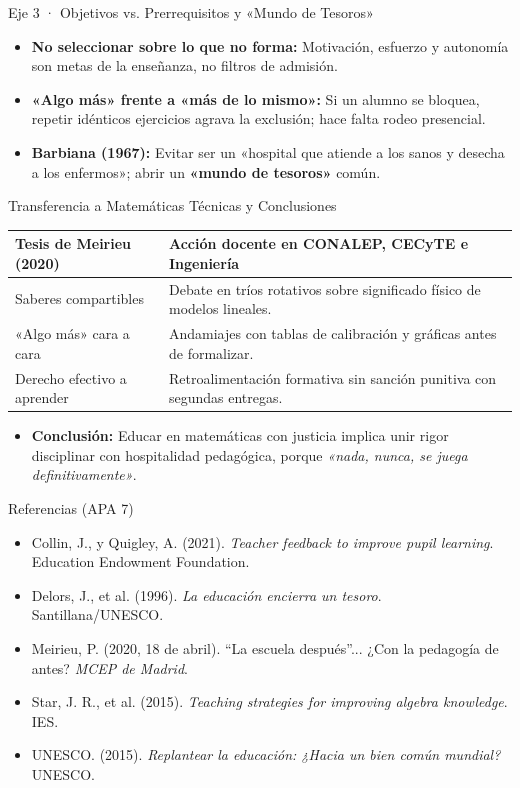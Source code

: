 \documentclass[aspectratio=169,spanish,xcolor=table]{beamer}
\begin{document}
\begin{frame}{Eje 3 · Objetivos vs. Prerrequisitos y «Mundo de Tesoros»}
  \begin{itemize}\normalsize
    \item \textbf{No seleccionar sobre lo que no forma:} Motivación, esfuerzo y autonomía son metas de la enseñanza, no filtros de admisión.
    \item \textbf{«Algo más» frente a «más de lo mismo»:} Si un alumno se bloquea, repetir idénticos ejercicios agrava la exclusión; hace falta rodeo presencial.
    \item \textbf{Barbiana (1967):} Evitar ser un «hospital que atiende a los sanos y desecha a los enfermos»; abrir un \textbf{«mundo de tesoros»} común.
  \end{itemize}
\end{frame}

\begin{frame}{Transferencia a Matemáticas Técnicas y Conclusiones}
  \renewcommand{\arraystretch}{1.28}
  \scriptsize
  \begin{tabular}{p{3.8cm}p{9.2cm}}
    \toprule
    \textbf{Tesis de Meirieu (2020)} & \textbf{Acción docente en CONALEP, CECyTE e Ingeniería} \\
    \midrule
    Saberes compartibles & Debate en tríos rotativos sobre significado físico de modelos lineales. \\
    «Algo más» cara a cara & Andamiajes con tablas de calibración y gráficas antes de formalizar. \\
    Derecho efectivo a aprender & Retroalimentación formativa sin sanción punitiva con segundas entregas. \\
    \bottomrule
  \end{tabular}
  \vspace{0.3cm}
  \begin{itemize}\small
    \item \textbf{Conclusión:} Educar en matemáticas con justicia implica unir rigor disciplinar con hospitalidad pedagógica, porque \textit{«nada, nunca, se juega definitivamente»}.
  \end{itemize}
\end{frame}

\begin{frame}{Referencias (APA 7)}
  \scriptsize\setlength{\parskip}{5pt}
  \begin{itemize}
    \item Collin, J., y Quigley, A. (2021). \textit{Teacher feedback to improve pupil learning}. Education Endowment Foundation.
    \item Delors, J., et al. (1996). \textit{La educación encierra un tesoro}. Santillana/UNESCO.
    \item Meirieu, P. (2020, 18 de abril). ``La escuela después''... ¿Con la pedagogía de antes? \textit{MCEP de Madrid}.
    \item Star, J. R., et al. (2015). \textit{Teaching strategies for improving algebra knowledge}. IES.
    \item UNESCO. (2015). \textit{Replantear la educación: ¿Hacia un bien común mundial?} UNESCO.
  \end{itemize}
\end{frame}
\end{document}
